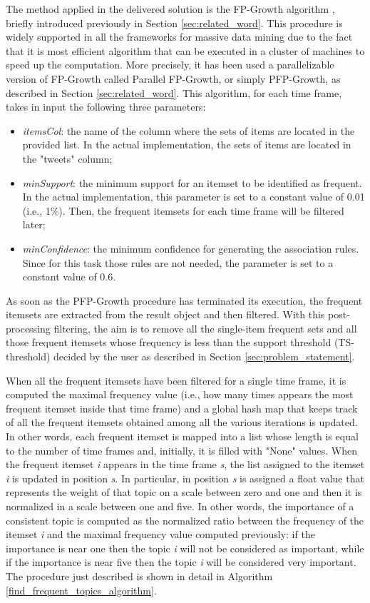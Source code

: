 The method applied in the delivered solution is the FP-Growth algorithm \cite{fpgrowth-paper}, briefly introduced previously in Section \ref{sec:related_word}. This procedure is widely supported in all the frameworks for massive data mining due to the fact that it is most efficient algorithm that can be executed in a cluster of machines to speed up the computation. More precisely, it has been used a parallelizable version of FP-Growth called Parallel FP-Growth, or simply PFP-Growth, as described in Section \ref{sec:related_word}. This algorithm, for each time frame, takes in input the following three parameters:
\begin{itemize}
	\item \textit{itemsCol}: the name of the column where the sets of items are located in the provided list. In the actual implementation, the sets of items are located in the "tweets" column;
	\item \textit{minSupport}: the minimum support for an itemset to be identified as frequent. In the actual implementation, this parameter is set to a constant value of 0.01 (i.e., 1\%). Then, the frequent itemsets for each time frame will be filtered later;
	\item \textit{minConfidence}: the minimum confidence for generating the association rules. Since for this task those rules are not needed, the parameter is set to a constant value of 0.6.
\end{itemize}

\noindent As soon as the PFP-Growth procedure has terminated its execution, the frequent itemsets are extracted from the result object and then filtered. With this post-processing filtering, the aim is to remove all the single-item frequent sets and all those frequent itemsets whose frequency is less than the support threshold (TS-threshold) decided by the user as described in Section \ref{sec:problem_statement}.

When all the frequent itemsets have been filtered for a single time frame, it is computed the maximal frequency value (i.e., how many times appears the most frequent itemset inside that time frame) and a global hash map that keeps track of all the frequent itemsets obtained among all the various iterations is updated. In other words, each frequent itemset is mapped into a list whose length is equal to the number of time frames and, initially, it is filled with "None" values. When the frequent itemset \textit{i} appears in the time frame \textit{s}, the list assigned to the itemset \textit{i} is updated in position \textit{s}. In particular, in position \textit{s} is assigned a float value that represents the weight of that topic on a scale between zero and one and then it is normalized in a scale between one and five. In other words, the importance of a consistent topic is computed as the normalized ratio between the frequency of the itemset \textit{i} and the maximal frequency value computed previously: if the importance is near one then the topic \textit{i} will not be considered as important, while if the importance is near five then the topic \textit{i} will be considered very important. The procedure just described is shown in detail in Algorithm \ref{find_frequent_topics_algorithm}.

